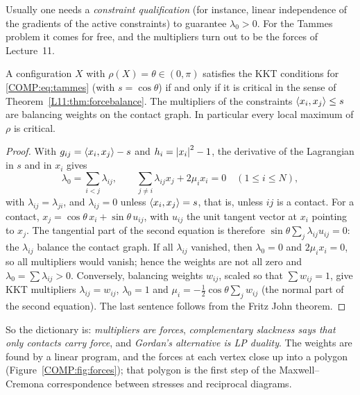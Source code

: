 Usually one needs a \emph{constraint qualification} (for instance, linear independence of the gradients of
the active constraints) to guarantee $\lambda_0>0$. For the Tammes problem it comes for free, and the
multipliers turn out to be the forces of Lecture~11.

\begin{proposition}\label{COMP:prop:kkt}
A configuration $X$ with $\rho(X)=\theta\in(0,\pi)$ satisfies the KKT conditions for
\eqref{COMP:eq:tammes} (with $s=\cos\theta$) if and only if it is critical in the sense of
Theorem~\ref{L11:thm:forcebalance}. The multipliers of the constraints $\langle x_i, x_j\rangle\le s$ are balancing
weights on the contact graph. In particular every local maximum of $\rho$ is critical.
\end{proposition}

\begin{proof}
With $g_{ij}=\langle x_i, x_j\rangle-s$ and $h_i=\left\lvert x_i \right\rvert^2-1$, the derivative of the Lagrangian in $s$ and in $x_i$
gives
\[
  \lambda_0=\sum_{i<j}\lambda_{ij},\qquad \sum_{j\ne i}\lambda_{ij}x_j+2\mu_ix_i=0\quad(1\le i\le N),
\]
with $\lambda_{ij}=\lambda_{ji}$, and $\lambda_{ij}=0$ unless $\langle x_i, x_j\rangle=s$, that is, unless $ij$ is a
contact. For a contact, $x_j=\cos\theta\,x_i+\sin\theta\,u_{ij}$, with $u_{ij}$ the unit tangent vector at
$x_i$ pointing to $x_j$. The tangential part of the second equation is therefore
$\sin\theta\sum_j\lambda_{ij}u_{ij}=0$: the $\lambda_{ij}$ balance the contact graph. If all
$\lambda_{ij}$ vanished, then $\lambda_0=0$ and $2\mu_ix_i=0$, so all multipliers would vanish; hence the
weights are not all zero and $\lambda_0=\sum\lambda_{ij}>0$. Conversely, balancing weights $w_{ij}$, scaled
so that $\sum w_{ij}=1$, give KKT multipliers $\lambda_{ij}=w_{ij}$, $\lambda_0=1$ and
$\mu_i=-\frac12\cos\theta\sum_jw_{ij}$ (the normal part of the second equation). The last sentence follows
from the Fritz John theorem.
\end{proof}

So the dictionary is: \emph{multipliers are forces}, \emph{complementary slackness says that only contacts
carry force}, and \emph{Gordan's alternative is LP duality}. The weights are found by a linear program,
and the forces at each vertex close up into a polygon (Figure~\ref{COMP:fig:forces}); that polygon is the
first step of the Maxwell--Cremona correspondence between stresses and reciprocal diagrams.

